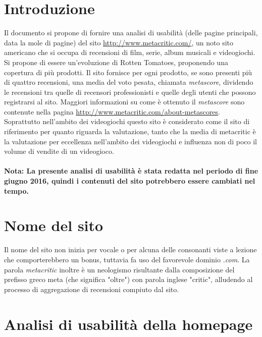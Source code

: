 \documentclass[12pt]{article}
\begin{document}
\newpage
\renewcommand{\contentsname}{Indice}
\tableofcontents

\newpage
{}

\section{Introduzione}
Il documento si propone di fornire una analisi di usabilità (delle pagine principali, data la mole di pagine) del sito \url{http://www.metacritic.com/}, un noto sito americano che si occupa di recensioni di film, serie, album musicali e videogiochi. Si propone di essere un'evoluzione di Rotten Tomatoes, proponendo una copertura di più prodotti. Il sito fornisce per ogni prodotto, se sono presenti più di quattro recensioni, una media del voto pesata, chiamata \textit{metascore}, dividendo le recensioni tra quelle di recensori professionisti e quelle degli utenti che possono registrarsi al sito. Maggiori informazioni su come è ottenuto il \textit{metascore} sono contenute nella pagina \url{http://www.metacritic.com/about-metascores}.\\
Soprattutto nell'ambito dei videogiochi questo sito è considerato come il sito di riferimento per quanto riguarda la valutazione, tanto che la media di metacritic è la valutazione per eccellenza nell'ambito dei videogiochi e influenza non di poco il volume di vendite di un videogioco.
\\ \\ \textbf{Nota: La presente analisi di usabilità è stata redatta nel periodo di fine giugno 2016, quindi i contenuti del sito potrebbero essere cambiati nel tempo.}
\section{Nome del sito}
Il nome del sito non inizia per vocale o per alcuna delle consonanti viste a lezione che comporterebbero un bonus, tuttavia fa uso del favorevole dominio \textit{.com}. La parola \textit{metacritic} inoltre è un neologismo risultante dalla composizione del prefisso greco meta (che significa "oltre") con parola inglese "critic", alludendo al processo di aggregazione di recensioni compiuto dal sito.
\newpage
\section{Analisi di usabilità della homepage}
\end{document}
